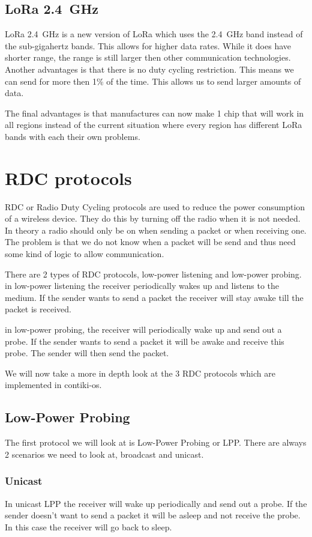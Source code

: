 \subsection{LoRa 2.4~GHz}
LoRa 2.4~GHz is a new version of LoRa which uses the 2.4~GHz band instead of the sub-gigahertz bands. This allows for higher data rates. While it does have shorter range, the range is still larger then other communication technologies. Another advantages is that there is no duty cycling restriction. This means we can send for more then 1\% of the time. This allows us to send larger amounts of data.

The final advantages is that manufactures can now make 1 chip that will work in all regions instead of the current situation where every region has different LoRa bands with each their own problems. 




\section{RDC protocols}

RDC or Radio Duty Cycling protocols are used to reduce the power consumption of a wireless device. They do this by turning off the radio when it is not needed. In theory a radio should only be on when sending a packet or when receiving one. The problem is that we do not know when a packet will be send and thus need some kind of logic to allow communication. 

There are 2 types of RDC protocols, low-power listening and low-power probing. in low-power listening the receiver periodically wakes up and listens to the medium. If the sender wants to send a packet the receiver will stay awake till the packet is received.

in low-power probing, the receiver will periodically wake up and send out a probe. If the sender wants to send a packet it will be awake and receive this probe. The sender will then send the packet. 

We will now take a more in depth look at the 3 RDC protocols which are implemented in contiki-os.

\subsection{Low-Power Probing}
The first protocol we will look at is Low-Power Probing or LPP. There are always 2 scenarios we need to look at, broadcast and unicast.

\subsubsection{Unicast}
In unicast LPP the receiver will wake up periodically and send out a probe. 
If the sender doesn't want to send a packet it will be asleep and not receive the probe. In this case the receiver will go back to sleep.

